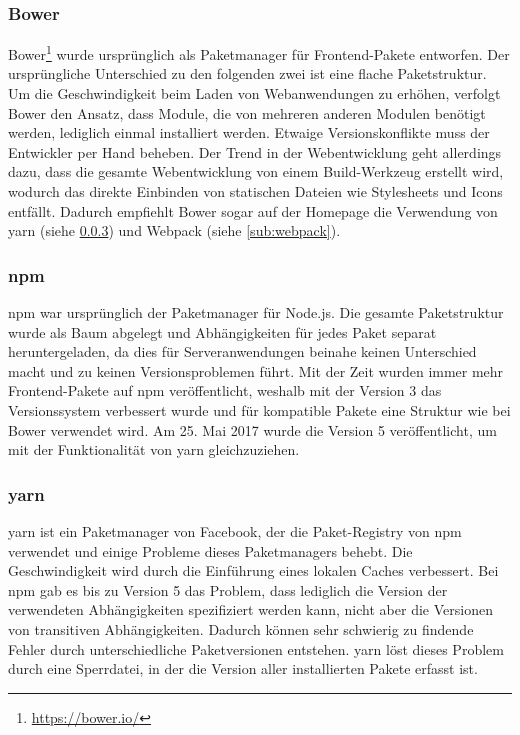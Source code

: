 \subsubsection{Bower}
\label{sub:bower}
Bower\footnote{\url{https://bower.io/}} wurde ursprünglich als Paketmanager für Frontend-Pakete entworfen.
Der ursprüngliche Unterschied zu den folgenden zwei ist eine flache Paketstruktur.
Um die Geschwindigkeit beim Laden von Webanwendungen zu erhöhen, verfolgt Bower den Ansatz, dass Module, die von mehreren anderen Modulen benötigt werden, lediglich einmal installiert werden.
Etwaige Versionskonflikte muss der Entwickler per Hand beheben.
Der Trend in der Webentwicklung geht allerdings dazu, dass die gesamte Webentwicklung von einem Build-Werkzeug erstellt wird, wodurch das direkte Einbinden von statischen Dateien wie Stylesheets und Icons entfällt.
Dadurch empfiehlt Bower sogar auf der Homepage die Verwendung von yarn (siehe \cref{sub:yarn}) und Webpack (siehe \cref{sub:webpack}).

\subsubsection{npm}
\label{sub:npm}
npm war ursprünglich der Paketmanager für Node.js.
Die gesamte Paketstruktur wurde als Baum abgelegt und Abhängigkeiten für jedes Paket separat heruntergeladen, da dies für Serveranwendungen beinahe keinen Unterschied macht und zu keinen Versionsproblemen führt.
Mit der Zeit wurden immer mehr Frontend-Pakete auf npm veröffentlicht, weshalb mit der Version 3 das Versionssystem verbessert wurde und für kompatible Pakete eine Struktur wie bei Bower verwendet wird.
Am 25. Mai 2017 wurde die Version 5 veröffentlicht, um mit der Funktionalität von yarn gleichzuziehen.

\subsubsection{yarn}
\label{sub:yarn}
yarn ist ein Paketmanager von Facebook, der die Paket-Registry von npm verwendet und einige Probleme dieses Paketmanagers behebt.
Die Geschwindigkeit wird durch die Einführung eines lokalen Caches verbessert.
Bei npm gab es bis zu Version 5 das Problem, dass lediglich die Version der verwendeten Abhängigkeiten spezifiziert werden kann, nicht aber die Versionen von transitiven Abhängigkeiten.
Dadurch können sehr schwierig zu findende Fehler durch unterschiedliche Paketversionen entstehen.
yarn löst dieses Problem durch eine Sperrdatei, in der die Version aller installierten Pakete erfasst ist.

